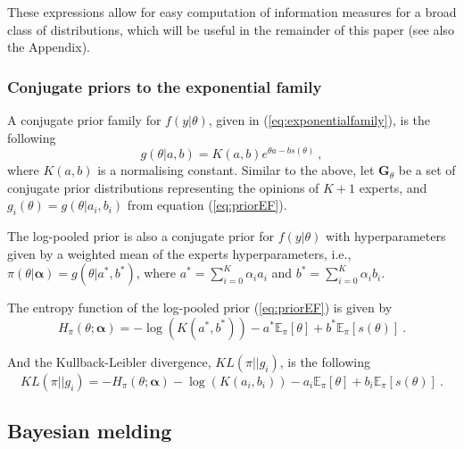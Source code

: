 \documentclass[a4paper, notitlepage, 10pt]{article}
\begin{document}
These expressions allow for easy computation of information measures for a broad class of distributions, which will be useful in the remainder of this paper (see also the Appendix).

\subsubsection{Conjugate priors to the exponential family}
\label{sec:conjugexpofamily}

A conjugate prior family for $f(y|\theta)$, given in (\ref{eq:exponentialfamily}), is the following
\begin{equation}
\label{eq:priorEF}
g(\theta | a, b) = K(a,b) e^{\theta a - b s(\theta)} \: ,
\end{equation}
where $K(a,b)$ is a normalising constant.
Similar to the above, let $\mathbf{G}_{\theta}$ be a set of conjugate prior distributions representing the opinions of $K+1$ experts, and $g_i(\theta) = g(\theta | a_i, b_i)$ from equation (\ref{eq:priorEF}).

The log-pooled prior is also a conjugate prior for $f(y|\theta)$ with hyperparameters given by a weighted mean of the experts hyperparameters, i.e., $\pi(\theta|\boldsymbol\alpha) = g(\theta | a^*, b^* )$, where $a^* = \sum_{i=0}^K \alpha_i a_i$ and $b^* = \sum_{i=0}^K \alpha_i b_i$.

The entropy function of the log-pooled prior (\ref{eq:priorEF}) is given by
\begin{equation}
\label{eq:entropypriorEF}
H_\pi(\theta; \boldsymbol\alpha) = - \log (K(a^*, b^*))  -  a^*  \mathbb{E}_\pi[\theta]  +  b^*  \mathbb{E}_\pi[s(\theta)] \: .
\end{equation}

And the Kullback-Leibler divergence, $KL(\pi || g_i )$, is the following
\begin{equation}
\label{eq:KLpriorEF}
KL( \pi || g_i ) = - H_\pi(\theta; \boldsymbol\alpha) - \log( K(a_i,b_i)) - a_i \mathbb{E}_\pi[\theta] + b_i \mathbb{E}_\pi[s(\theta)] \: .
\end{equation}


\subsection{Bayesian melding}
\label{sec:background_melding}
\end{document}
